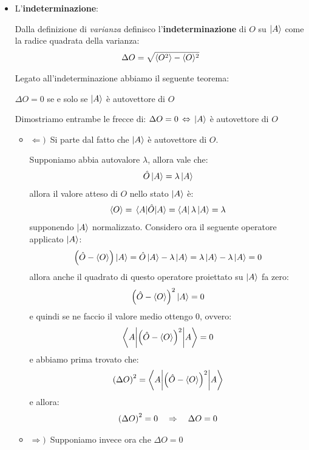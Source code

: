 \begin{itemize}
\item L'\textbf{indeterminazione}:

\begin{mydef}
	Dalla definizione di \textit{varianza} definisco l'\textbf{indeterminazione} di $O$ su $\ket{A}$ come la radice quadrata della varianza:
\begin{align*}
	\Delta O= \sqrt{\langle O^2 \rangle - \langle O \rangle^2}
\end{align*}
\end{mydef}

	Legato all'indeterminazione abbiamo il seguente teorema:
	
\begin{myth}
	$\Delta O = 0 $ se e solo se $\ket{A}$ è autovettore di $O$
\end{myth}

\begin{myprf}
	Dimostriamo entrambe le frecce di: $\Delta O = 0 \, \Leftrightarrow \, \ket{A}$ è autovettore di $O$
\begin{itemize}[label={},  leftmargin=5pt]
	\item $\Leftarrow) \, $ Si parte dal fatto che $\ket{A}$ è autovettore di $O$.
		
		\qquad Supponiamo abbia autovalore $\lambda$, allora vale che:
	\begin{align*}
		\hat{O}\ket{A} = \lambda \ket{A}
	\end{align*}
		\qquad allora il valore atteso di $O$ nello stato $\ket{A}$ è:
	\begin{align*}
		\langle O \rangle = \mel{A}{\hat{O}}{A} = \bra{A} \lambda \ket{A} = \lambda
	\end{align*}
		\qquad supponendo $\ket{A}$ normalizzato. Considero ora il seguente operatore applicato $\ket{A}$:
	\begin{align*}
		\qty(\hat{O} - \langle O \rangle) \ket{A} = \hat{O}\ket{A} - \lambda \ket{A} = \lambda \ket{A} - \lambda \ket{A} = 0
	\end{align*}
		allora anche il quadrato di questo operatore proiettato su $\ket{A}$ fa zero:
	\begin{align*}
		\qty(\hat{O} - \langle O \rangle)^2 \ket{A} = 0
	\end{align*}
		e quindi se ne faccio il valore medio ottengo 0, ovvero:
	\begin{align*}
		\mel**{A}{ \qty(\hat{O} - \langle O \rangle)^2 }{A} = 0
	\end{align*}
		e abbiamo prima trovato che:
	\begin{align*}
		\qty(\Delta O)^2 =\mel**{A}{ \qty(\hat{O} - \langle O \rangle)^2 }{A}
	\end{align*}
		e allora:
	\begin{align*}
		\qty(\Delta O)^2 = 0 \quad \Rightarrow \quad \Delta O = 0
	\end{align*}
	\item $\Rightarrow) \, $ Supponiamo invece ora che $\Delta O = 0$
	

\end{itemize}
\end{myprf}
\end{itemize}
